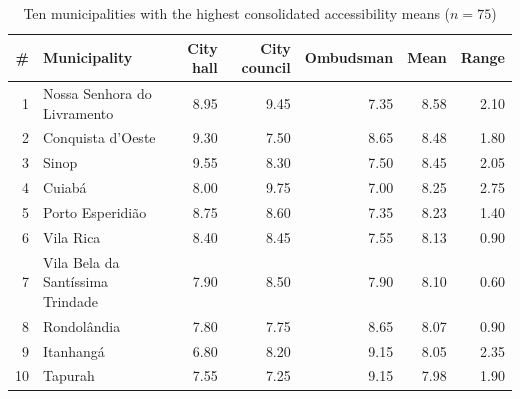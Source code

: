 \documentclass[12pt]{article}
\begin{document}
\begin{table}[ht]
\centering
\caption{Ten municipalities with the highest consolidated accessibility means ($n = 75$)}
\label{tab:ranking}
\footnotesize
\setlength{\tabcolsep}{4pt}
\begin{tabular}{rlrrrrr}
\toprule
\textbf{\#} & \textbf{Municipality} & \textbf{City hall} & \textbf{City council} & \textbf{Ombudsman} & \textbf{Mean} & \textbf{Range} \\
\midrule
1  & Nossa Senhora do Livramento      & 8.95 & 9.45 & 7.35 & 8.58 & 2.10 \\
2  & Conquista d'Oeste                & 9.30 & 7.50 & 8.65 & 8.48 & 1.80 \\
3  & Sinop                            & 9.55 & 8.30 & 7.50 & 8.45 & 2.05 \\
4  & Cuiabá                           & 8.00 & 9.75 & 7.00 & 8.25 & 2.75 \\
5  & Porto Esperidião                 & 8.75 & 8.60 & 7.35 & 8.23 & 1.40 \\
6  & Vila Rica                        & 8.40 & 8.45 & 7.55 & 8.13 & 0.90 \\
7  & Vila Bela da Santíssima Trindade & 7.90 & 8.50 & 7.90 & 8.10 & 0.60 \\
8  & Rondolândia                      & 7.80 & 7.75 & 8.65 & 8.07 & 0.90 \\
9  & Itanhangá                        & 6.80 & 8.20 & 9.15 & 8.05 & 2.35 \\
10 & Tapurah                          & 7.55 & 7.25 & 9.15 & 7.98 & 1.90 \\
\bottomrule
\end{tabular}
\end{table}
\end{document}
